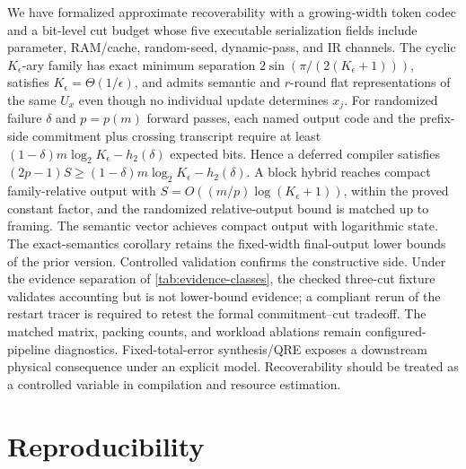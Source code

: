 \documentclass[aps,prx,reprint,floatfix,superscriptaddress]{revtex4-2}
\begin{document}
We have formalized approximate recoverability with a growing-width token
codec and a bit-level cut budget whose five executable serialization fields
include parameter, RAM/cache, random-seed, dynamic-pass, and IR channels.
The cyclic $K_\epsilon$-ary family has exact minimum separation
$2\sin(\pi/(2(K_\epsilon+1)))$, satisfies
$K_\epsilon=\Theta(1/\epsilon)$, and admits semantic and $r$-round flat
representations of the same $U_x$ even though no individual update
determines $x_j$.  For randomized failure $\delta$ and $p=p(m)$ forward
passes, each named output code and the prefix-side commitment plus crossing
transcript require at least
$(1-\delta)m\log_2K_\epsilon-h_2(\delta)$ expected bits.  Hence a deferred
compiler satisfies $(2p-1)S\geq
(1-\delta)m\log_2K_\epsilon-h_2(\delta)$.  A block hybrid reaches compact
family-relative output with
$S=O((m/p)\log(K_\epsilon+1))$, within the proved constant factor, and the
randomized relative-output bound is matched up to framing.  The semantic
vector achieves compact output with logarithmic state.  The exact-semantics
corollary retains the fixed-width final-output lower bounds of the prior
version. Controlled validation confirms the constructive side.  Under the
evidence separation of \cref{tab:evidence-classes}, the checked three-cut
fixture validates accounting but is not lower-bound evidence; a compliant
rerun of the restart tracer is required to retest the formal commitment--cut
tradeoff.  The matched matrix, packing counts, and workload ablations remain
configured-pipeline diagnostics.  Fixed-total-error synthesis/QRE exposes a
downstream physical consequence under an explicit model. Recoverability should
be treated as a controlled variable in compilation and resource estimation.


\section*{Reproducibility}
\label{sec:reproducibility}
\end{document}

